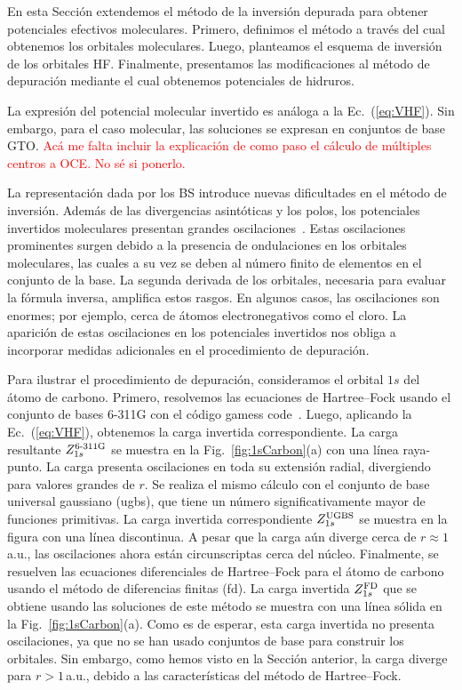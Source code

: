 En esta Sección extendemos el método de la inversión depurada para 
obtener potenciales efectivos moleculares. Primero, definimos el método 
a través del cual obtenemos los orbitales moleculares. Luego, planteamos 
el esquema de inversión de los orbitales HF. Finalmente, presentamos las 
modificaciones al método de depuración mediante el cual obtenemos 
potenciales de hidruros.

La expresión del potencial molecular invertido es análoga a la 
Ec.~(\ref{eq:VHF}). Sin embargo, para el caso molecular, las soluciones 
se expresan en conjuntos de base GTO. 
\textcolor{red}{Acá me falta incluir la explicación de como paso el 
cálculo de múltiples centros a OCE. No sé si ponerlo.} 

La representación dada por los BS introduce nuevas dificultades en el 
método de inversión. Además de las divergencias asintóticas y los polos, 
los potenciales invertidos moleculares presentan grandes 
oscilaciones~\cite{Schipper:97,Mura:97,Jacob:11,Gaiduk:13}. Estas 
oscilaciones prominentes surgen debido a la presencia de ondulaciones en 
los orbitales moleculares, las cuales a su vez se deben al número finito 
de elementos en el conjunto de la base. La segunda derivada de los 
orbitales, necesaria para evaluar la fórmula inversa, amplifica estos 
rasgos. En algunos casos, las oscilaciones son enormes; por ejemplo, 
cerca de átomos electronegativos como el cloro. La aparición de estas 
oscilaciones en los potenciales invertidos nos obliga a incorporar 
medidas adicionales en el procedimiento de depuración.

Para ilustrar el procedimiento de depuración, consideramos el orbital 
$1s$ del átomo de carbono. Primero, resolvemos las ecuaciones de 
Hartree--Fock usando el conjunto de bases \mbox{6-311G} con el código 
{\sc gamess} code~\cite{Schmidt:93,Gordon:05}. Luego, aplicando la  
Ec.~(\ref{eq:VHF}), obtenemos la carga invertida correspondiente. La 
carga resultante $Z_{1s}^{\mbox{\scriptsize 6-311G}}$ se muestra en la 
Fig.~\ref{fig:1sCarbon}(a) con una línea raya-punto. La carga presenta 
oscilaciones en toda su extensión radial, divergiendo para valores 
grandes de $r$. Se realiza el mismo cálculo con el conjunto de base 
universal gaussiano (\acs{ugbs}), que tiene un número significativamente 
mayor de funciones primitivas. La carga invertida correspondiente 
$Z_{1s}^{\mbox{\scriptsize UGBS}}$ se muestra en la figura con una línea 
discontinua. A pesar que la carga aún diverge cerca de 
$r\approx1\,$a.u., las oscilaciones ahora están circunscriptas cerca del 
núcleo. Finalmente, se resuelven las ecuaciones diferenciales de 
Hartree--Fock para el átomo de carbono usando el método de diferencias 
finitas (\acs{fd}). La carga invertida $Z_{1s}^{\mbox{\scriptsize FD}}$ 
que se obtiene usando las soluciones de este método se muestra con una 
línea sólida en la Fig.~\ref{fig:1sCarbon}(a). Como es de esperar, esta 
carga invertida no presenta oscilaciones, ya que no se han usado 
conjuntos de base para construir los orbitales. Sin embargo, como hemos 
visto en la Sección anterior, la carga diverge para $r>1\,$a.u., debido 
a las características del método de Hartree--Fock. 

